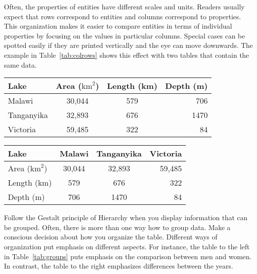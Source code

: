 Often, the properties of entities have different scales and units. Readers usually expect that rows correspond to entities and columns correspond to properties. This organization makes it easier to compare entities in terms of individual properties by focusing on the values in particular columns. Special cases can be spotted easily if they are printed vertically and the eye can move downwards. The example in Table~\ref{tab:colrows} shows this effect with two tables that contain the same data.

\begin{table*}[tb]
  \caption{\label{tab:colrows} The table to the left is easier to read than the table to the right (reproduced from \cite{Carter12} with permission).}
  \centering
  \footnotesize %
  {\renewcommand{\arraystretch}{1.1} %
  \begin{tabularx}{0.45\linewidth}{@{}Xccr@{}} %
    \toprule
    Lake & Area ($\mathrm{km}^2$) & Length (km) & Depth (m)\\
    \midrule
    Malawi & 30,044 & 579 & 706 \\
    Tanganyika & 32,893 & 676 & 1470 \\
    Victoria & 59,485 & 322 & 84\\
    \bottomrule
  \end{tabularx}
  \hspace{\fill}
  \begin{tabularx}{0.45\linewidth}{@{}Xccr@{}} %
    \toprule
    Lake & Malawi & Tanganyika & Victoria\\
    \midrule
    Area ($\mathrm{km}^2$) & 30,044 & 32,893 & 59,485 \\
    Length (km) & 579 & 676 & 322 \\
    Depth (m) & 706 & 1470 & 84\\
    \bottomrule
  \end{tabularx}
  }
\end{table*}

Follow the Gestalt principle of Hierarchy when you display information that can be grouped. Often, there is more than one way how to group data. Make a conscious decision about how you organize the table. Different ways of organization put emphasis on different aspects. For instance, the table to the left in Table~\ref{tab:groups} puts emphasis on the comparison between men and women. In contrast, the table to the right emphasizes differences between the years.

